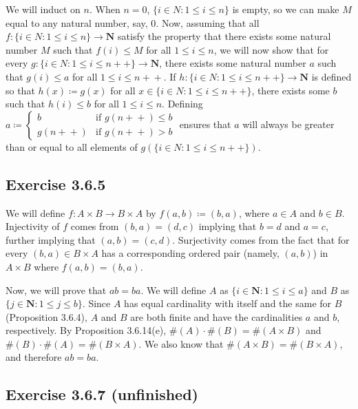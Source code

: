 \documentclass[12pt, oneside]{book}
\newcommand{\increment}{\! + \! +}
\begin{document}
	We will induct on $n$. When $n = 0$, $\{i \in N: 1 \le i \le n\}$ is empty, so we can make $M$ equal to any natural number, say, $0$. Now, assuming that all $f \colon \{i \in N: 1 \le i \le n\} \rightarrow \mathbf{N}$ satisfy the property that there exists some natural number $M$ such that $f(i) \le M$ for all $1 \le i \le n$, we will now show that for every $g \colon \{i \in N: 1 \le i \le n \increment\} \rightarrow \mathbf{N}$, there exists some natural number $a$ such that $g(i) \le a$ for all $1 \le i \le n \increment$. If $h \colon \{i \in N: 1 \le i \le n \increment\} \rightarrow \mathbf{N}$ is defined so that $h(x) \coloneqq g(x)$ for all $x \in \{i \in N: 1 \le i \le n \increment\}$, there exists some $b$ such that $h(i) \le b$ for all $1 \le i \le n$. Defining $a \coloneqq \begin{cases}
		b & \text{if } g(n \increment) \le b \\
		g(n \increment) & \text{if } g(n \increment) > b
	\end{cases}$ ensures that $a$ will always be greater than or equal to all elements of $g(\{i \in N: 1 \le i \le n \increment\})$.
	
	\subsection*{Exercise 3.6.5}
	
	We will define $f \colon A \times B \rightarrow B \times A$ by $f(a, b) \coloneqq (b, a)$, where $a \in A$ and $b \in B$. Injectivity of $f$ comes from $(b, a) = (d, c)$ implying that $b = d$ and $a = c$, further implying that $(a, b) = (c, d)$. Surjectivity comes from the fact that for every $(b, a) \in B \times A$ has a corresponding ordered pair (namely, $(a, b)$) in $A \times B$ where $f(a, b) = (b, a)$.
	
	Now, we will prove that $ab = ba$. We will define $A$ as $\{i \in \mathbf{N}: 1 \le i \le a\}$ and $B$ as $\{j \in \mathbf{N}: 1 \le j \le b\}$. Since $A$ has equal cardinality with itself and the same for $B$ (Proposition 3.6.4), $A$ and $B$ are both finite and have the cardinalities $a$ and $b$, respectively. By Proposition 3.6.14(e), $\#(A) \cdot \#(B) = \#(A \times B)$ and $\#(B) \cdot \#(A) = \#(B \times A)$. We also know that $\#(A \times B) = \#(B \times A)$, and therefore $ab = ba$.
	
	\subsection*{Exercise 3.6.7 (unfinished)}
	
\end{document}
